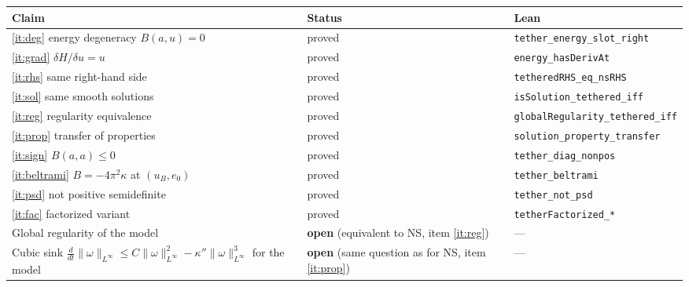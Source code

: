 \documentclass[11pt,a4paper]{article}
\theoremstyle{definition}
\theoremstyle{remark}
\newcommand{\lean}[1]{\texttt{#1}}
\begin{document}
\begin{center}\small
\begin{tabular}{@{}p{}p{}p{}@{}}
\toprule
Claim & Status & Lean\\
\midrule
\ref{it:deg} energy degeneracy $B(a,u)=0$ & proved & \lean{tether\_\allowbreak{}energy\_\allowbreak{}slot\_\allowbreak{}right}\\
\ref{it:grad} $\delta H/\delta u=u$ & proved & \lean{energy\_\allowbreak{}hasDerivAt}\\
\ref{it:rhs} same right-hand side & proved & \lean{tetheredRHS\_\allowbreak{}eq\_\allowbreak{}nsRHS}\\
\ref{it:sol} same smooth solutions & proved & \lean{isSolution\_\allowbreak{}tethered\_\allowbreak{}iff}\\
\ref{it:reg} regularity equivalence & proved & \lean{globalRegularity\_\allowbreak{}tethered\_\allowbreak{}iff}\\
\ref{it:prop} transfer of properties & proved & \lean{solution\_\allowbreak{}property\_\allowbreak{}transfer}\\
\ref{it:sign} $B(a,a)\le0$ & proved & \lean{tether\_\allowbreak{}diag\_\allowbreak{}nonpos}\\
\ref{it:beltrami} $B=-4\pi^2\kappa$ at $(u_B,e_0)$ & proved & \lean{tether\_\allowbreak{}beltrami}\\
\ref{it:psd} not positive semidefinite & proved & \lean{tether\_\allowbreak{}not\_\allowbreak{}psd}\\
\ref{it:fac} factorized variant & proved & \lean{tetherFactorized\_\allowbreak{}*}\\
\midrule
Global regularity of the model & \textbf{open} (equivalent to NS, item \ref{it:reg}) & ---\\
Cubic sink $\frac{d}{dt}\|\omega\|_{L^\infty}\le C\|\omega\|_{L^\infty}^2-\kappa''\|\omega\|_{L^\infty}^3$ for the model & \textbf{open} (same question as for NS, item \ref{it:prop}) & ---\\
\bottomrule
\end{tabular}
\end{center}
\end{document}
